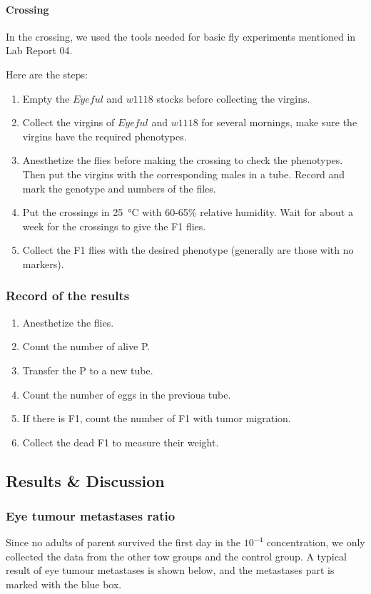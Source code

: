 \paragraph{Crossing}
In the crossing, we used the tools needed for basic fly experiments mentioned in Lab Report 04.
	
Here are the steps:
	
		\begin{enumerate}
			\item Empty the $Eyeful$ and $w1118$ stocks before collecting the virgins.
			\item Collect the virgins of $Eyeful$ and $w1118$ for several mornings, make sure the virgins have the required phenotypes.
			\item Anesthetize the flies before making the crossing to check the phenotypes. Then put the virgins with the corresponding males in a tube. Record and mark the genotype and numbers of the files.
			\item Put the crossings in \SI{25}{\celsius} with  60-65\% relative humidity. Wait for about a week for the crossings to give the F1 flies.
			\item Collect the F1 flies with the desired phenotype (generally are those with no markers).
		\end{enumerate}

\subsubsection{Record of the results}
\begin{enumerate}
    \item Anesthetize the flies.
    \item Count the number of alive P.
    \item Transfer the P to a new tube.
    \item Count the number of eggs in the previous tube.
    \item If there is F1, count the number of F1 with tumor migration.
    \item Collect the dead F1 to measure their weight.
\end{enumerate}

\subsection{Results \& Discussion}

\subsubsection{Eye tumour metastases ratio}
Since no adults of parent survived the first day in the $10^{-4}$ concentration, we only collected the data from the other tow groups and the control group. A typical result of eye tumour metastases is shown below, and the metastases part is marked with the blue box.

